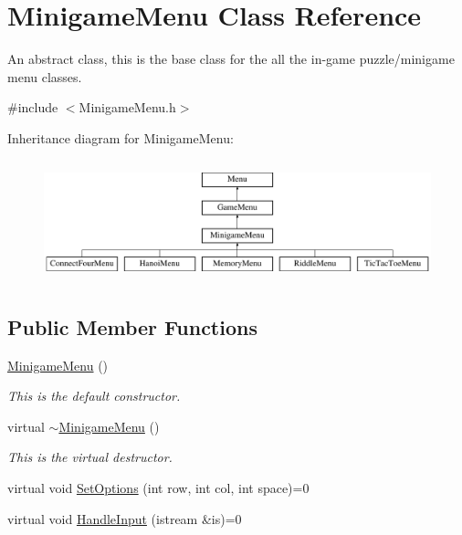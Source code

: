 \hypertarget{classMinigameMenu}{\section{Minigame\-Menu Class Reference}
\label{classMinigameMenu}
}


An abstract class, this is the base class for the all the in-\/game puzzle/minigame menu classes.  




{\ttfamily \#include $<$Minigame\-Menu.\-h$>$}

Inheritance diagram for Minigame\-Menu\-:\begin{figure}[H]
\begin{center}
\leavevmode
\includegraphics[height=3.555556cm]{classMinigameMenu}
\end{center}
\end{figure}
\subsection*{Public Member Functions}
\begin{DoxyCompactItemize}
\item 
\hypertarget{classMinigameMenu_a90d42578d68f68c3b26c414f90f2d950}{\hyperlink{classMinigameMenu_a90d42578d68f68c3b26c414f90f2d950}{Minigame\-Menu} ()}\label{classMinigameMenu_a90d42578d68f68c3b26c414f90f2d950}

\begin{DoxyCompactList}\small\item\em This is the default constructor. \end{DoxyCompactList}\item 
\hypertarget{classMinigameMenu_a6b8621ca44319d6b2759766bdca9cbf9}{virtual \hyperlink{classMinigameMenu_a6b8621ca44319d6b2759766bdca9cbf9}{$\sim$\-Minigame\-Menu} ()}\label{classMinigameMenu_a6b8621ca44319d6b2759766bdca9cbf9}

\begin{DoxyCompactList}\small\item\em This is the virtual destructor. \end{DoxyCompactList}\item 
virtual void \hyperlink{classMinigameMenu_abde3ae319bf1660a8626c6f765e054a8}{Set\-Options} (int row, int col, int space)=0
\item 
virtual void \hyperlink{classMinigameMenu_a3f854c4eefb0f3110cd085b3cfe56460}{Handle\-Input} (istream \&is)=0
\end{DoxyCompactItemize}
